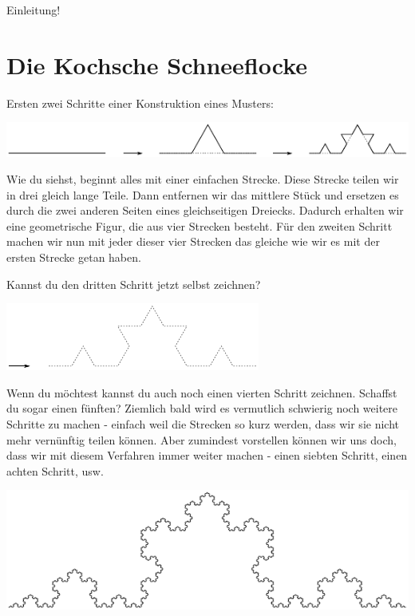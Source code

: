 \documentclass[a4paper,ngerman,12pt]{scrartcl}
\theoremstyle{definition}
\theoremstyle{plain}
\theoremstyle{remark}
\begin{document}
Einleitung!


\section{Die Kochsche Schneeflocke}

Ersten zwei Schritte einer Konstruktion eines Musters:

\begin{center}
	\includegraphics[width=.9\textwidth]{Bilder/Schneeflocke-Konstruktion1.pdf}
\end{center}

Wie du siehst, beginnt alles mit einer einfachen Strecke. Diese Strecke teilen wir in drei gleich lange Teile. Dann entfernen wir das mittlere Stück und ersetzen es durch die zwei anderen Seiten eines gleichseitigen Dreiecks. Dadurch erhalten wir eine geometrische Figur, die aus vier Strecken besteht. Für den zweiten Schritt machen wir nun mit jeder dieser vier Strecken das gleiche wie wir es mit der ersten Strecke getan haben.

Kannst du den dritten Schritt jetzt selbst zeichnen?

\begin{center}
	\includegraphics[width=.7\textwidth]{Bilder/Schneeflocke-Konstruktion2.pdf}
\end{center}

Wenn du möchtest kannst du auch noch einen vierten Schritt zeichnen. Schaffst du sogar einen fünften? Ziemlich bald wird es vermutlich schwierig noch weitere Schritte zu machen - einfach weil die Strecken so kurz werden, dass wir sie nicht mehr vernünftig teilen können. Aber zumindest vorstellen können wir uns doch, dass wir mit diesem Verfahren immer weiter machen - einen siebten Schritt, einen achten Schritt, usw. 

\begin{center}
	\includegraphics[width=.5\textwidth]{Bilder/Schneeflocke-Konstruktion3.pdf}
\end{center}
\end{document}
